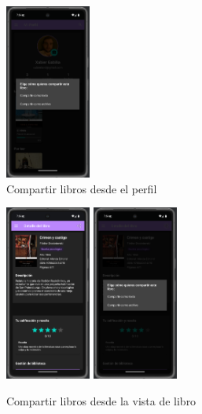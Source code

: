 \documentclass[a4paper,11pt]{report}
\begin{document}
      \begin{figure}[H]
        \centering
        \includegraphics[width=0.25\textwidth]{.img/compartir_perfil.png}
        \caption{Compartir libros desde el perfil}
        \label{fig:compartir-perfil}
      \end{figure}
      \begin{figure}[H]
        \centering
        \includegraphics[width=0.25\textwidth]{.img/compartir_libro_1.png}
        \hspace{2cm}
        \includegraphics[width=0.25\textwidth]{.img/compartir_libro_2.png}
        \caption{Compartir libros desde la vista de libro}
        \label{fig:compartir-libro}
      \end{figure}
\end{document}
